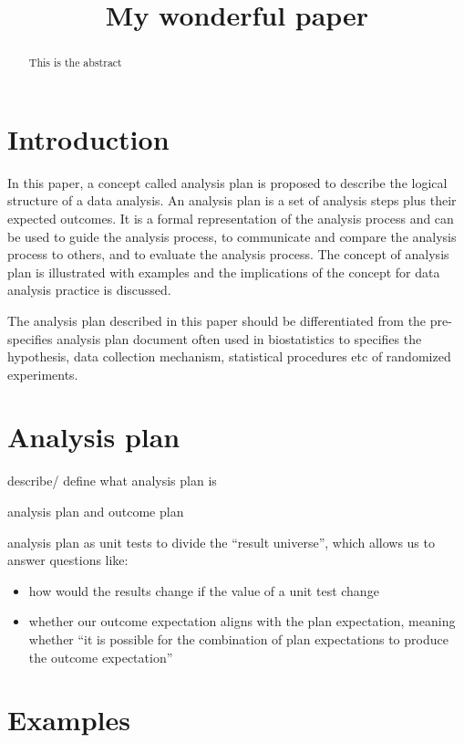 \documentclass[
]{jds}
\title{My wonderful paper}
\author{}
\date{}
\providecommand{\tightlist}{%
  \setlength{\itemsep}{0pt}\setlength{\parskip}{0pt}}\usepackage{longtable,booktabs,array}
\begin{document}
\maketitle
\begin{abstract}
This is the abstract
\end{abstract}

\section{Introduction}\label{introduction}

In this paper, a concept called analysis plan is proposed to describe
the logical structure of a data analysis. An analysis plan is a set of
analysis steps plus their expected outcomes. It is a formal
representation of the analysis process and can be used to guide the
analysis process, to communicate and compare the analysis process to
others, and to evaluate the analysis process. The concept of analysis
plan is illustrated with examples and the implications of the concept
for data analysis practice is discussed.

The analysis plan described in this paper should be differentiated from
the pre-specifies analysis plan document often used in biostatistics to
specifies the hypothesis, data collection mechanism, statistical
procedures etc of randomized experiments.

\section{Analysis plan}\label{analysis-plan}

describe/ define what analysis plan is

analysis plan and outcome plan

analysis plan as unit tests to divide the ``result universe'', which
allows us to answer questions like:

\begin{itemize}
\tightlist
\item
  how would the results change if the value of a unit test change
\item
  whether our outcome expectation aligns with the plan expectation,
  meaning whether ``it is possible for the combination of plan
  expectations to produce the outcome expectation''
\end{itemize}

\section{Examples}\label{examples}
\end{document}
